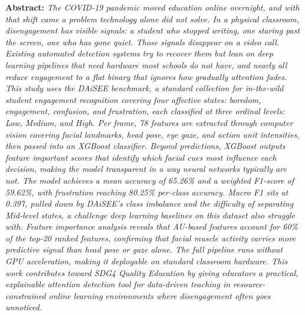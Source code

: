 \begin{mdframed}[
    innerleftmargin=5pt,
    innerrightmargin=7pt,
    innertopmargin=6pt,
    innerbottommargin=6pt,
    topline=false,
    bottomline=false,
    skipabove=5pt,
    skipbelow=5pt,
    leftline=false,
    rightline=false,
  ]
  \noindent\textbf{Abstract:}
  \textit{
    The COVID-19 pandemic moved education online overnight, and with that shift came a problem technology alone did not solve. In a physical classroom, disengagement has visible signals: a student who stopped writing, one staring past the screen, one who has gone quiet. Those signals disappear on a video call. Existing automated detection systems try to recover them but lean on deep learning pipelines that need hardware most schools do not have, and nearly all reduce engagement to a flat binary that ignores how gradually attention fades. This study uses the DAiSEE benchmark, a standard collection for in-the-wild student engagement recognition covering four affective states: boredom, engagement, confusion, and frustration, each classified at three ordinal levels: Low, Medium, and High. Per frame, 78 features are extracted through computer vision covering facial landmarks, head pose, eye gaze, and action unit intensities, then passed into an XGBoost classifier. Beyond predictions, XGBoost outputs feature important scores that identify which facial cues most influence each decision, making the model transparent in a way neural networks typically are not. The model achieves a mean accuracy of 65.26\% and a weighted F1-score of 59.62\%, with frustration reaching 80.25\% per-class accuracy. Macro F1 sits at 0.397, pulled down by DAiSEE's class imbalance and the difficulty of separating Mid-level states, a challenge deep learning baselines on this dataset also struggle with. Feature importance analysis reveals that AU-based features account for 60\% of the top-20 ranked features, confirming that facial muscle activity carries more predictive signal than head pose or gaze alone. The full pipeline runs without GPU acceleration, making it deployable on standard classroom hardware. This work contributes toward SDG4 Quality Education by giving educators a practical, explainable attention detection tool for data-driven teaching in resource-constrained online learning environments where disengagement often goes unnoticed.
  }
\end{mdframed}

\vspace*{-8pt}

